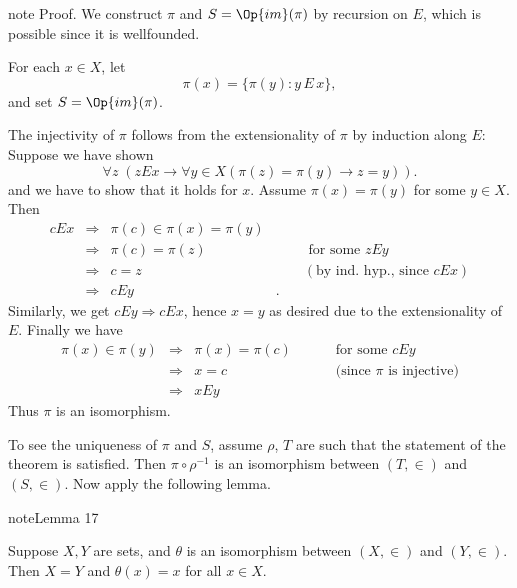 \documentclass[letterpaper,10pt,english]{jupyterBook}
\begin{document}
\begin{sphinxadmonition}{note}
\sphinxAtStartPar
Proof. We construct \(\pi\) and \(S = \Op{im}(\pi)\) by recursion on \(E\), which is possible since it is well\sphinxhyphen{}founded.

\sphinxAtStartPar
For each \(x \in X\), let
\begin{equation*}
    \pi(x) = \{\pi(y) \colon y \, E \, x \},
\end{equation*}
\sphinxAtStartPar
and set \(S = \Op{im}(\pi)\).

\sphinxAtStartPar
The injectivity of \(\pi\) follows from the extensionality of \(\pi\) by induction along \(E\): 	
Suppose we have shown
\begin{equation*}
\forall z \; (z E x \to \forall y  \in X (\pi(z) = \pi(y) \to z = y)).
\end{equation*}
\sphinxAtStartPar
and we have to show that it holds for \(x\). Assume \(\pi(x) = \pi(y)\) for some \(y \in X\). Then
\begin{align*}
cEx &\Rightarrow& \pi(c) \in \pi(x) = \pi(y) &\\
&\Rightarrow& \pi(c) = \pi(z) & \qquad \text{ for some } zEy\\
&\Rightarrow& c=z & \qquad  (\text{by ind. hyp., since } cEx)\\
&\Rightarrow& cEy &.
\end{align*}
\sphinxAtStartPar
Similarly, we get \(cEy \Rightarrow cEx\), hence \(x=y\) as desired due to the extensionality of \(E\). Finally we have
\begin{align*}
\pi(x) \in \pi(y) & \Rightarrow & \pi(x) = \pi(c) & \qquad \text{ for some } cEy \\
&\Rightarrow& x = c & \qquad \text{ (since $\pi$ is injective)}\\
&\Rightarrow& xEy &
\end{align*}
\sphinxAtStartPar
Thus \(\pi\) is an isomorphism.

\sphinxAtStartPar
To see the uniqueness of \(\pi\) and \(S\), assume \(\rho\), \(T\) are such that the statement of the theorem is satisfied. Then \(\pi \circ \rho^{-1}\) is an isomorphism between \((T, \in)\) and \((S,\in)\). Now apply the following lemma.
\end{sphinxadmonition}
\label{models:lem-Mostowski-unique}
\begin{sphinxadmonition}{note}{Lemma 17}



\sphinxAtStartPar
Suppose \(X,Y\) are sets, and \(\theta\) is an isomorphism between \((X,\in)\) and \((Y,\in)\). Then \(X=Y\) and \(\theta(x) = x\) for all \(x \in X\).
\end{sphinxadmonition}
\end{document}
